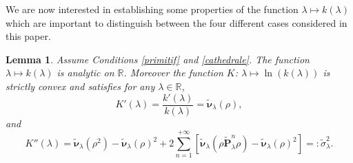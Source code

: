 \documentclass[12pt]{amsart}
\newtheorem{lemma}[theorem]{Lemma}
\theoremstyle{definition}
\numberwithin{equation}{section}
\def\bb#1{\mathbb{#1}}
\def\tt#1{\tilde{#1}}
\def\tbf#1{\tilde{\mathbf{#1}}}
\def\tbs#1{\tilde{\boldsymbol{#1}}}
\renewcommand\ll{\lambda}
\begin{document}
We are now interested in establishing some properties of the function $\ll \mapsto k(\ll)$ which are important to distinguish 
between the four different cases considered in this paper.
\begin{lemma}
\label{mulet}
Assume Conditions \ref{primitif} and \ref{cathedrale}. The function $\ll \mapsto k(\ll)$ is analytic on $\bb R$. Moreover the function $K$: $\ll \mapsto \ln\left( k(\ll) \right)$ is strictly convex and satisfies for any $\ll \in \bb R$,
\begin{equation}
	\label{chevalBP}
	K'(\ll) = \frac{k'(\ll)}{k(\ll)} = \tbs \nu_{\ll} (\rho),
\end{equation}
and
\begin{equation}
	\label{ane}
	K''(\ll) = \tbs \nu_{\ll} \left( \rho^2 \right) -  \tbs \nu_{\ll} \left( \rho \right)^2 + 2 \sum_{n=1}^{+\infty} \left[ \tbs \nu_{\ll} \left( \rho \tbf P_{\ll}^n \rho \right) -  \tbs \nu_{\ll} \left( \rho \right)^2 \right]  =:\tt \sigma_{\ll}^2.
\end{equation}
\end{lemma}
\end{document}
